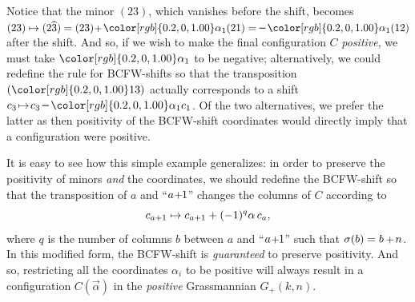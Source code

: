 \documentclass[12pt,hyperref,compress]{JHEP3}
\renewcommand{\hat}{\widehat}
\newcommand{\eq}[1]{\begin{equation}#1\end{equation}}
\newcommand{\mi}{{\rm\rule[2.4pt]{6pt}{0.65pt}}}
\newcommand{\pl}{\hspace{0.5pt}\text{{\small+}}\hspace{-0.5pt}}
\begin{document}
{\noindent Notice that the minor $(23)$, which vanishes before the shift, becomes $(23)\mapsto(2\hat{3})=(23)\pl\,{\color[rgb]{0.2,0,1.00}\alpha_{1}} (21)=\mi\,{\color[rgb]{0.2,0,1.00}\alpha_{1}} (12)$ after the shift. And so, if we wish to make the final configuration $C$ {\it positive}, we must take ${\color[rgb]{0.2,0,1.00}\alpha_{1}}$ to be negative; alternatively, we could redefine the rule for BCFW-shifts so that the transposition $({\color[rgb]{0.2,0,1.00}13})$ actually corresponds to a shift $c_3\!\mapsto\!c_3\,\mi\,{\color[rgb]{0.2,0,1.00}\alpha_{1}}c_1$. Of the two alternatives, we prefer the latter as then positivity of the BCFW-shift coordinates would directly imply that a configuration were positive.

It is easy to see how this simple example generalizes: in order to preserve the positivity of minors {\it and} the coordinates, we should redefine the BCFW-shift so that the transposition of $a$ and ``$a\pl1$'' changes the columns of $C$ according to
\vspace{-.2cm}\eq{c_{a+1}\mapsto c_{a+1}+(-1)^q\alpha\,c_a,\label{signed_bcfw_shift}\vspace{-.2cm}}
where $q$ is the number of columns $b$ between $a$ and ``$a\pl1$'' such that $\sigma(b)=b\,\pl\,n$. In this modified form, the BCFW-shift is {\it guaranteed} to preserve positivity. And so, restricting all the coordinates $\alpha_i$ to be positive will always result in a configuration $C(\vec{\alpha})$ in the {\it positive} Grassmannian $G_+(k,n)$.

}
\end{document}
